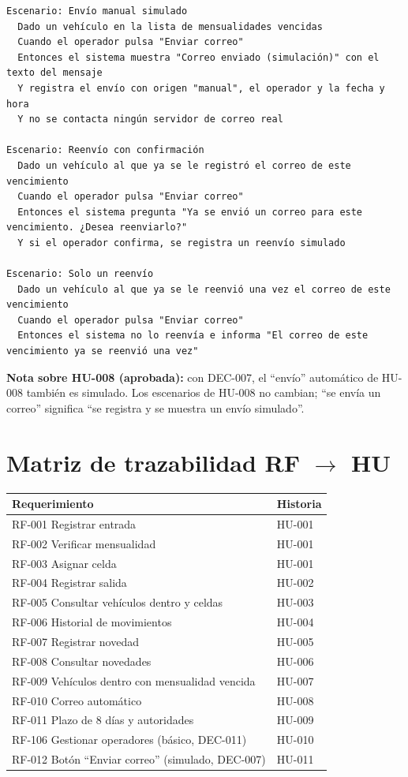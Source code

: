 \begin{lstlisting}[style=gherkin]
Escenario: Envío manual simulado
  Dado un vehículo en la lista de mensualidades vencidas
  Cuando el operador pulsa "Enviar correo"
  Entonces el sistema muestra "Correo enviado (simulación)" con el texto del mensaje
  Y registra el envío con origen "manual", el operador y la fecha y hora
  Y no se contacta ningún servidor de correo real

Escenario: Reenvío con confirmación
  Dado un vehículo al que ya se le registró el correo de este vencimiento
  Cuando el operador pulsa "Enviar correo"
  Entonces el sistema pregunta "Ya se envió un correo para este vencimiento. ¿Desea reenviarlo?"
  Y si el operador confirma, se registra un reenvío simulado

Escenario: Solo un reenvío
  Dado un vehículo al que ya se le reenvió una vez el correo de este vencimiento
  Cuando el operador pulsa "Enviar correo"
  Entonces el sistema no lo reenvía e informa "El correo de este vencimiento ya se reenvió una vez"
\end{lstlisting}
\textbf{Nota sobre HU-008 (aprobada):} con DEC-007, el ``envío'' automático de HU-008 también es simulado. Los escenarios de HU-008 no cambian; ``se envía un correo'' significa ``se registra y se muestra un envío simulado''.\\

\section{Matriz de trazabilidad RF $\rightarrow$ HU}
\begin{longtable}{>{\raggedright\arraybackslash}p{9.0cm}>{\raggedright\arraybackslash}p{5.4cm}}
\toprule
\textbf{Requerimiento} & \textbf{Historia}\\
\midrule\endhead
RF-001 Registrar entrada & HU-001\\
RF-002 Verificar mensualidad & HU-001\\
RF-003 Asignar celda & HU-001\\
RF-004 Registrar salida & HU-002\\
RF-005 Consultar vehículos dentro y celdas & HU-003\\
RF-006 Historial de movimientos & HU-004\\
RF-007 Registrar novedad & HU-005\\
RF-008 Consultar novedades & HU-006\\
RF-009 Vehículos dentro con mensualidad vencida & HU-007\\
RF-010 Correo automático & HU-008\\
RF-011 Plazo de 8 días y autoridades & HU-009\\
RF-106 Gestionar operadores (básico, DEC-011) & HU-010\\
RF-012 Botón ``Enviar correo'' (simulado, DEC-007) & HU-011\\
\bottomrule
\end{longtable}
